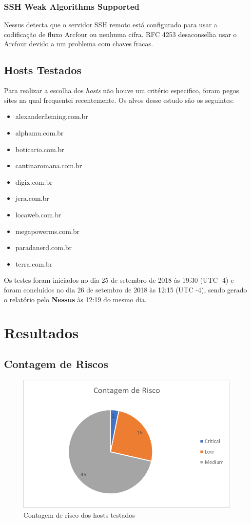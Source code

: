 \documentclass[
	12pt,				%
	openright,			%
	twoside,			%
	a4paper,			%
	english,			%
	french,				%
	spanish,			%
	brazil				%
	]{abntex2}
\begin{document}
\subsection{SSH Weak Algorithms Supported}
Nessus detecta que o servidor SSH remoto está configurado para usar a codificação de fluxo Arcfour ou nenhuma cifra. RFC 4253 desaconselha usar o Arcfour devido a um problema com chaves fracas.

\section{Hosts Testados}
Para realizar a escolha dos \textit{hosts} não houve um critério especifico, foram pegos sites na qual frequentei recentemente. Os alvos desse estudo são os seguintes:
\begin{itemize}
	\item alexanderfleming.com.br
	\item alphamu.com.br
	\item boticario.com.br
	\item cantinaromana.com.br
	\item digix.com.br
	\item jera.com.br
	\item locaweb.com.br
	\item megapowerms.com.br
	\item paradanerd.com.br
	\item terra.com.br
\end{itemize}
Os testes foram iniciados no dia 25 de setembro de 2018 às 19:30 (UTC -4) e foram concluídos no dia 26 de setembro de 2018 às 12:15 (UTC -4), sendo gerado o relatório pelo \textbf{Nessus} às 12:19 do mesmo dia.
\chapter{Resultados}
\section{Contagem de Riscos}
\begin{figure}[h]
	\centering
	\includegraphics[width=0.7\linewidth]{Imagens/screenshot001}
	\caption[Contagem de Risco]{Contagem de risco dos hosts testados}
	\label{contagem_de_risco}
\end{figure}
\end{document}
